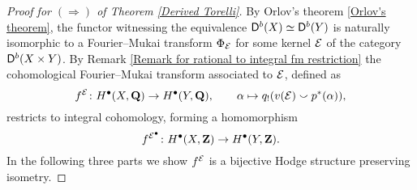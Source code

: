 
\begin{proof}[Proof for $(\Rightarrow)$ of Theorem \ref{Derived Torelli}]
    By Orlov's theorem \ref{Orlov's theorem}, the functor witnessing the equi\-valence $\mathsf{D}^b(X) \simeq \mathsf{D}^b(Y)$ is naturally isomorphic to a Fourier--Mukai transform $\Phi_{\mathcal E}$ for some kernel $\mathcal E$ of the category $\mathsf{D}^b(X \times Y)$. 
    By Remark \ref{Remark for rational to integral fm restriction} the cohomological Fourier--Mukai transform associated to $\mathcal E$, defined as
     \[
        f^{\mathcal E} \colon H^\bullet(X, \mathbf Q) \to H^\bullet(Y, \mathbf Q), \qquad \alpha \mapsto q_!(v(\mathcal E) \smallsmile p^*(\alpha)),
    \]
    restricts to integral cohomology, forming a homomorphism
    \[
        f^{\mathcal E^\bullet} \colon H^\bullet(X, \mathbf Z) \to H^\bullet(Y, \mathbf Z).
    \]
    In the following three parts we show $f^{\mathcal E}$ is a bijective Hodge structure preserving isometry.
    

\end{proof}
